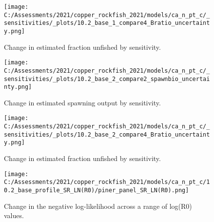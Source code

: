 \documentclass[11pt,
  english,
  a4paper,
]{article}
\begin{document}
\tagmcend\tagstructend


\begin{figure}
\centering
\texttt{[image: C:/Assessments/2021/copper\_rockfish\_2021/models/ca\_n\_pt\_c/\_sensitivities/\_plots/10.2\_base\_1\_compare4\_Bratio\_uncertainty.png]}
\caption{Change in estimated fraction unfished by sensitivity.\label{fig:sens-depl-1}}
\end{figure}

\tagmcend\tagstructend


\begin{figure}
\centering
\texttt{[image: C:/Assessments/2021/copper\_rockfish\_2021/models/ca\_n\_pt\_c/\_sensitivities/\_plots/10.2\_base\_2\_compare2\_spawnbio\_uncertainty.png]}
\caption{Change in estimated spawning output by sensitivity.\label{fig:sens-ssb-2}}
\end{figure}

\tagmcend\tagstructend


\begin{figure}
\centering
\texttt{[image: C:/Assessments/2021/copper\_rockfish\_2021/models/ca\_n\_pt\_c/\_sensitivities/\_plots/10.2\_base\_2\_compare4\_Bratio\_uncertainty.png]}
\caption{Change in estimated fraction unfished by sensitivity.\label{fig:sens-depl-2}}
\end{figure}

\tagmcend\tagstructend


\begin{figure}
\centering
\texttt{[image: C:/Assessments/2021/copper\_rockfish\_2021/models/ca\_n\_pt\_c/10.2\_base\_profile\_SR\_LN(R0)/piner\_panel\_SR\_LN(R0).png]}
\caption{Change in the negative log-likelihood across a range of log(R0) values.\label{fig:r0-profile}}
\end{figure}
\end{document}

